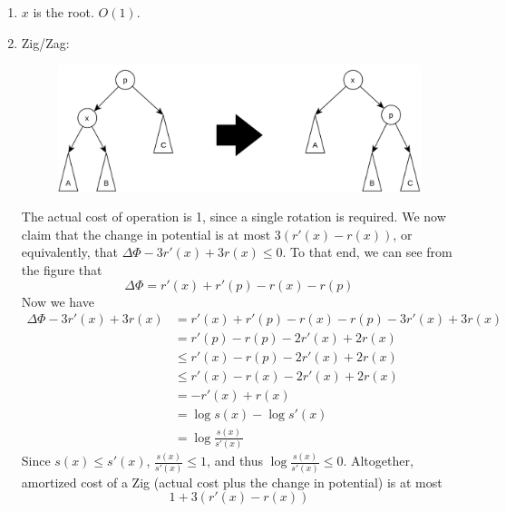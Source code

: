 \documentclass[12pt]{article}
\begin{document}
\begin{enumerate}
  \item $x$ is the root. $O(1)$.
  \item Zig/Zag:
  \begin{figure}[!ht]
    \centering
    \includegraphics[scale=0.2]{pics/splay_zig2}
  \end{figure}

  The actual cost of operation is 1, since a single rotation is required. We now claim that the change in potential is at most $3(r'(x) - r(x))$, or equivalently, that $\Delta\Phi - 3r'(x) + 3r(x) \leq 0$. To that end, we can see from the figure that
  \[ \Delta\Phi = r'(x) + r'(p) - r(x) - r(p) \]
  Now we have
  \begin{align*}
    \Delta\Phi - 3r'(x) + 3r(x) &= r'(x) + r'(p) - r(x) - r(p) - 3r'(x) + 3r(x) \\
    &= r'(p) - r(p) - 2r'(x) + 2r(x) \\
    &\leq r'(x) - r(p) - 2r'(x) + 2r(x) \\
    &\leq r'(x) - r(x) - 2r'(x) + 2r(x) \\
    &= -r'(x) + r(x) \\
    &= \log s(x) - \log s'(x) \\
    &= \log \frac{s(x)}{s'(x)}
  \end{align*}
  Since $s(x) \leq s'(x)$, $\frac{s(x)}{s'(x)} \leq 1$, and thus $\log \frac{s(x)}{s'(x)} \leq 0$. Altogether, amortized cost of a Zig (actual cost plus the change in potential) is at most
  \[ 1 + 3(r'(x) - r(x)) \]


\end{enumerate}
\end{document}
